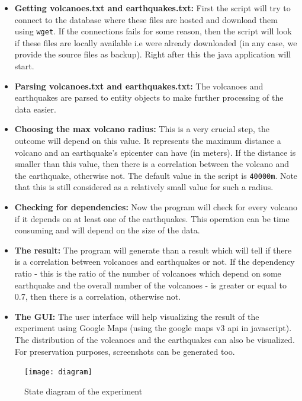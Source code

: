 \documentclass[12pt, a4paper]{article}
\begin{document}
\begin{itemize}
\item {\bf Getting volcanoes.txt and earthquakes.txt:} First the script will try to connect to the database where these files are hosted and download them using \verb|wget|. If the connections fails for some reason, then the script will look if these files are locally available i.e were already downloaded (in any case, we provide the source files as backup). Right after this the java application will start.
\item {\bf Parsing volcanoes.txt and earthquakes.txt:} The volcanoes and earthquakes are parsed to entity objects to make further processing of the data easier.
\item {\bf Choosing the max volcano radius:} This is a very crucial step, the outcome will depend on this value. It represents the maximum distance a volcano and an earthquake's epicenter can have (in meters). If the distance is smaller than this value, then there is a correlation between the volcano and the earthquake, otherwise not. The default value in the script is \verb|40000m|. Note that this is still considered as a relatively small value for such a radius.
\item {\bf Checking for dependencies:} Now the program will check for every volcano if it depends on at least one of the earthquakes. This operation can be time consuming and will depend on the size of the data.
\item {\bf The result:} The program will generate than a result which will tell if there is a correlation between volcanoes and earthquakes or not. If the dependency ratio - this is the ratio of the number of volcanoes which depend on some earthquake and the overall number of the volcanoes - is greater or equal to 0.7, then there is a correlation, otherwise not.
\item {\bf The GUI:} The user interface will help visualizing the result of the experiment using Google Maps (using the google maps v3 api in javascript). The distribution of the volcanoes and the earthquakes can also be visualized. For preservation purposes, screenshots can be generated too. 
\end{itemize}
\begin{figure}[h]
  \centering
    \texttt{[image: diagram]}
    \caption{State diagram of the experiment}
\end{figure}
\end{document}
